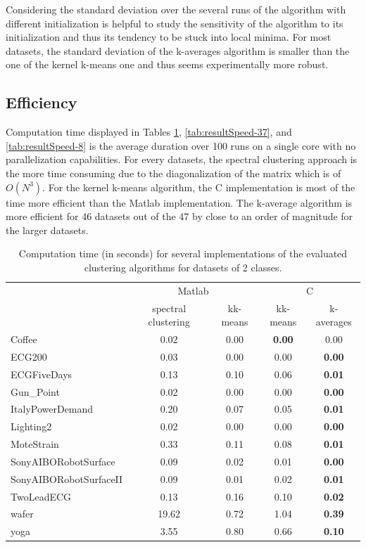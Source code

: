 \documentclass[natbib,smallextended]{svjour3}
\begin{document}
Considering the standard deviation over the several runs of the algorithm with different initialization is helpful to study the sensitivity of the algorithm to its initialization and thus its tendency to be stuck into local minima. For most datasets, the standard deviation of the k-averages algorithm is smaller than the one of the kernel k-means one and thus seems experimentally more robust.

\subsection{Efficiency}

Computation time displayed in Tables \ref{tab:resultSpeed-2}, \ref{tab:resultSpeed-37}, and \ref{tab:resultSpeed-8} is the average duration over 100 runs on a single core with no parallelization capabilities. For every datasets, the spectral clustering approach is the more time consuming due to the diagonalization of the matrix which is of $O(N^3)$. For the kernel k-means algorithm, the C implementation is most of the time more efficient than the Matlab implementation. The k-average algorithm is more efficient for 46 datasets out of the 47 by close to an order of magnitude for the larger datasets.

\begin{table}
\begin{center}
\caption{Computation time (in seconds) for several implementations of the evaluated clustering algorithms for datasets of 2 classes.}
\label{tab:resultSpeed-2}
\begin{tabular}{lcccc}
 & \multicolumn{2}{c}{Matlab} & \multicolumn{2}{c}{C} \\
 & spectral clustering & kk-means & kk-means & k-averages \\
\hline
Coffee & 0.02 & 0.00 & \textbf{0.00} & 0.00 \\
ECG200 & 0.03 & 0.00 & 0.00 & \textbf{0.00} \\
ECGFiveDays & 0.13 & 0.10 & 0.06 & \textbf{0.01} \\
Gun\_Point & 0.02 & 0.00 & 0.00 & \textbf{0.00} \\
ItalyPowerDemand & 0.20 & 0.07 & 0.05 & \textbf{0.01} \\
Lighting2 & 0.02 & 0.00 & 0.00 & \textbf{0.00} \\
MoteStrain & 0.33 & 0.11 & 0.08 & \textbf{0.01} \\
SonyAIBORobotSurface & 0.09 & 0.02 & 0.01 & \textbf{0.00} \\
SonyAIBORobotSurfaceII & 0.09 & 0.01 & 0.02 & \textbf{0.01} \\
TwoLeadECG & 0.13 & 0.16 & 0.10 & \textbf{0.02} \\
wafer & 19.62 &  0.72 &  1.04 & \textbf{ 0.39} \\
yoga & 3.55 & 0.80 & 0.66 & \textbf{0.10} \\
\end{tabular}
\end{center}
\end{table}
\end{document}
